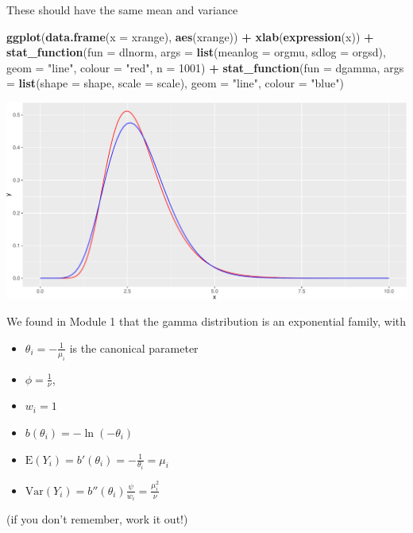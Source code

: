 \documentclass[
  ignorenonframetext,
]{beamer}
\newenvironment{Shaded}{\begin{snugshade}}{\end{snugshade}}
\newcommand{\AttributeTok}[1]{\textcolor[rgb]{0.13,0.29,0.53}{#1}}
\newcommand{\DecValTok}[1]{\textcolor[rgb]{0.00,0.00,0.81}{#1}}
\newcommand{\FunctionTok}[1]{\textcolor[rgb]{0.13,0.29,0.53}{\textbf{#1}}}
\newcommand{\NormalTok}[1]{#1}
\newcommand{\SpecialCharTok}[1]{\textcolor[rgb]{0.81,0.36,0.00}{\textbf{#1}}}
\newcommand{\StringTok}[1]{\textcolor[rgb]{0.31,0.60,0.02}{#1}}
\providecommand{\tightlist}{%
  \setlength{\itemsep}{0pt}\setlength{\parskip}{0pt}}
\begin{document}
\begin{frame}[fragile]{These should have the same mean and variance}
\protect\hypertarget{these-should-have-the-same-mean-and-variance}{}
\begin{Shaded}
\begin{Highlighting}[]
\FunctionTok{ggplot}\NormalTok{(}\FunctionTok{data.frame}\NormalTok{(}\AttributeTok{x =}\NormalTok{ xrange), }\FunctionTok{aes}\NormalTok{(xrange)) }\SpecialCharTok{+} \FunctionTok{xlab}\NormalTok{(}\FunctionTok{expression}\NormalTok{(x)) }\SpecialCharTok{+} \FunctionTok{stat\_function}\NormalTok{(}\AttributeTok{fun =}\NormalTok{ dlnorm,}
    \AttributeTok{args =} \FunctionTok{list}\NormalTok{(}\AttributeTok{meanlog =}\NormalTok{ orgmu, }\AttributeTok{sdlog =}\NormalTok{ orgsd), }\AttributeTok{geom =} \StringTok{"line"}\NormalTok{, }\AttributeTok{colour =} \StringTok{"red"}\NormalTok{, }\AttributeTok{n =} \DecValTok{1001}\NormalTok{) }\SpecialCharTok{+}
    \FunctionTok{stat\_function}\NormalTok{(}\AttributeTok{fun =}\NormalTok{ dgamma, }\AttributeTok{args =} \FunctionTok{list}\NormalTok{(}\AttributeTok{shape =}\NormalTok{ shape, }\AttributeTok{scale =}\NormalTok{ scale), }\AttributeTok{geom =} \StringTok{"line"}\NormalTok{,}
        \AttributeTok{colour =} \StringTok{"blue"}\NormalTok{)}
\end{Highlighting}
\end{Shaded}

\includegraphics{Module04PoissonGammaPresentationWeek2_files/figure-beamer/unnamed-chunk-15-1.pdf}
\end{frame}

\begin{frame}
We found in Module 1 that the gamma distribution is an exponential
family, with

\begin{itemize}
\tightlist
\item
  \(\theta_i=-\frac{1}{\mu_i}\) is the canonical parameter
\item
  \(\phi=\frac{1}{\nu}\),
\item
  \(w_i=1\)
\item
  \(b(\theta_i)=-\ln(-\theta_i)\)
\item
  \(\text{E}(Y_i)=b'(\theta_i)=-\frac{1}{\theta_i}=\mu_i\)
\item
  \(\text{Var}(Y_i)=b''(\theta_i)\frac{\psi}{w_i}=\frac{\mu_i^2}{\nu}\)
\end{itemize}

(if you don't remember, work it out!)
\end{frame}
\end{document}
